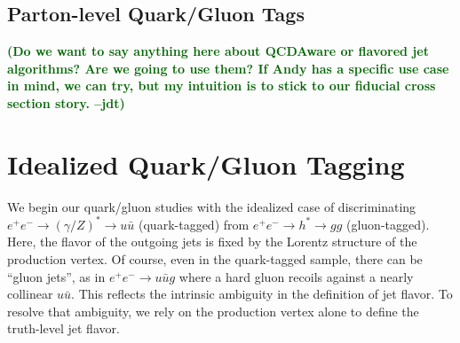 \documentclass[11pt,letterpaper]{article}
\newcommand{\jdt}[1]{\textbf{\textcolor{darkgreen}{(#1 --jdt)}}}
\begin{document}
\subsection{Parton-level Quark/Gluon Tags}

\jdt{Do we want to say anything here about QCDAware or flavored jet algorithms?  Are we going to use them?  If Andy has a specific use case in mind, we can try, but my intuition is to stick to our fiducial cross section story.}

\section{Idealized Quark/Gluon Tagging}
\label{sec:ee}

We begin our quark/gluon studies with the idealized case of discriminating $e^+ e^- \to (\gamma/Z)^* \to u \bar{u}$ (quark-tagged) from $e^+ e^- \to h^* \to gg$ (gluon-tagged).  Here, the flavor of the outgoing jets is fixed by the Lorentz structure of the production vertex.  Of course, even in the quark-tagged sample, there can be ``gluon jets'', as in $e^+ e^- \to u \bar{u} g$ where a hard gluon recoils against a nearly collinear $u \bar{u}$.  This reflects the intrinsic ambiguity in the definition of jet flavor.   To resolve that ambiguity, we rely on the production vertex alone to define the truth-level jet flavor.
\end{document}
